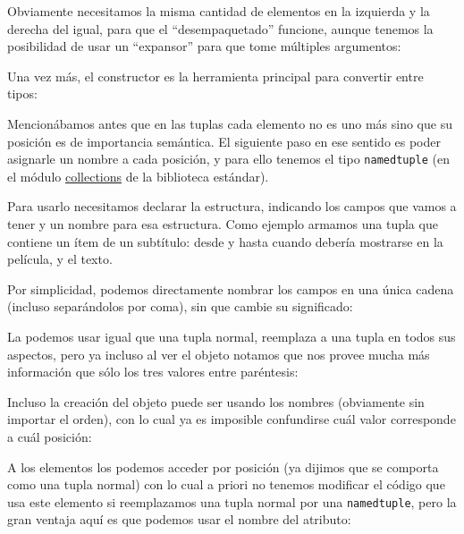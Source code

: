 
Obviamente necesitamos la misma cantidad de elementos en la izquierda y la derecha del igual, para que el ``desempaquetado'' funcione, aunque tenemos la posibilidad de usar un ``expansor'' para que tome múltiples argumentos:


Una vez más, el constructor es la herramienta principal para convertir entre tipos:


Mencionábamos antes que en las tuplas cada elemento no es uno más sino que su posición es de importancia semántica. El siguiente paso en ese sentido es poder asignarle un nombre a cada posición, y para ello tenemos el tipo \texttt{namedtuple} (en el módulo \href{https://docs.python.org/es/dev/library/collections.html}{collections} de la biblioteca estándar).

Para usarlo necesitamos declarar la estructura, indicando los campos que vamos a tener y un nombre para esa estructura. Como ejemplo armamos una tupla que contiene un ítem de un subtítulo: desde y hasta cuando debería mostrarse en la película, y el texto.


Por simplicidad, podemos directamente nombrar los campos en una única cadena (incluso separándolos por coma), sin que cambie su significado:


La podemos usar igual que una tupla normal, reemplaza a una tupla en todos sus aspectos, pero ya incluso al ver el objeto notamos que nos provee mucha más información que sólo los tres valores entre paréntesis:


Incluso la creación del objeto puede ser usando los nombres (obviamente sin importar el orden), con lo cual ya es imposible confundirse cuál valor corresponde a cuál posición:


A los elementos los podemos acceder por posición (ya dijimos que se comporta como una tupla normal) con lo cual a priori no tenemos modificar el código que usa este elemento si reemplazamos una tupla normal por una \texttt{namedtuple}, pero la gran ventaja aquí es que podemos usar el nombre del atributo:

